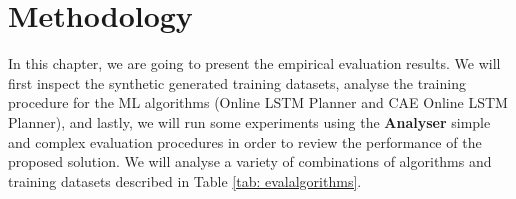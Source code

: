 
\section{Methodology}

In this chapter, we are going to present the empirical evaluation results. We will first inspect the synthetic generated training datasets, analyse the training procedure for the ML algorithms (Online LSTM Planner and CAE Online LSTM Planner), and lastly, we will run some experiments using the \textbf{Analyser} simple and complex evaluation procedures in order to review the performance of the proposed solution. We will analyse a variety of combinations of algorithms and training datasets described in Table \ref{tab: evalalgorithms}. 

